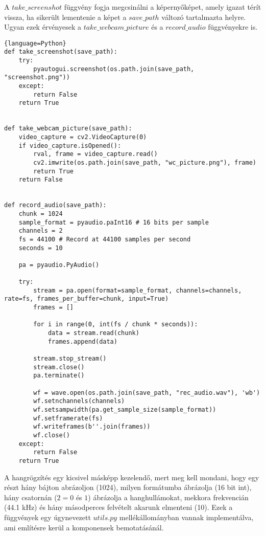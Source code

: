 \documentclass[a4paper, 11pt]{article}
\begin{document}
A $take\_screenshot$ függvény fogja megcsinálni a képernyőképet, amely igazat térít vissza, ha sikerült lementenie a képet a $save\_path$ változó tartalmazta helyre. Ugyan ezek érvényesek a $take\_webcam\_picture$ és a $record\_audio$ függvényekre is.
\begin{lstlisting}{language=Python}
def take_screenshot(save_path):
	try:
		pyautogui.screenshot(os.path.join(save_path, "screenshot.png"))
	except:
		return False
	return True

	
def take_webcam_picture(save_path):
	video_capture = cv2.VideoCapture(0)
	if video_capture.isOpened():
		rval, frame = video_capture.read()
		cv2.imwrite(os.path.join(save_path, "wc_picture.png"), frame)
		return True
	return False


def record_audio(save_path):
	chunk = 1024
	sample_format = pyaudio.paInt16 # 16 bits per sample
	channels = 2
	fs = 44100 # Record at 44100 samples per second
	seconds = 10

	pa = pyaudio.PyAudio()

	try:
		stream = pa.open(format=sample_format, channels=channels, rate=fs, frames_per_buffer=chunk, input=True)
		frames = []

		for i in range(0, int(fs / chunk * seconds)):
			data = stream.read(chunk)
			frames.append(data)

		stream.stop_stream()
		stream.close()
		pa.terminate()

		wf = wave.open(os.path.join(save_path, "rec_audio.wav"), 'wb')
		wf.setnchannels(channels)
		wf.setsampwidth(pa.get_sample_size(sample_format))
		wf.setframerate(fs)
		wf.writeframes(b''.join(frames))
		wf.close()
	except:
		return False
	return True
\end{lstlisting}
A hangrögzítés egy kicsivel másképp kezelendő, mert meg kell mondani, hogy egy részt hány bájton abrázoljon (1024), milyen formátumba ábrázolja (16 bit int), hány csatornán ($2 = 0$ és $1$) ábrázolja a hanghullámokat, mekkora frekvencián (44.1 kHz) és hány másodperces felvételt akarunk elmenteni (10). Ezek a függvények egy úgynevezett $utils.py$ mellékállományban vannak implementálva, ami említésre kerül a komponensek bemotatásánál.
\end{document}
